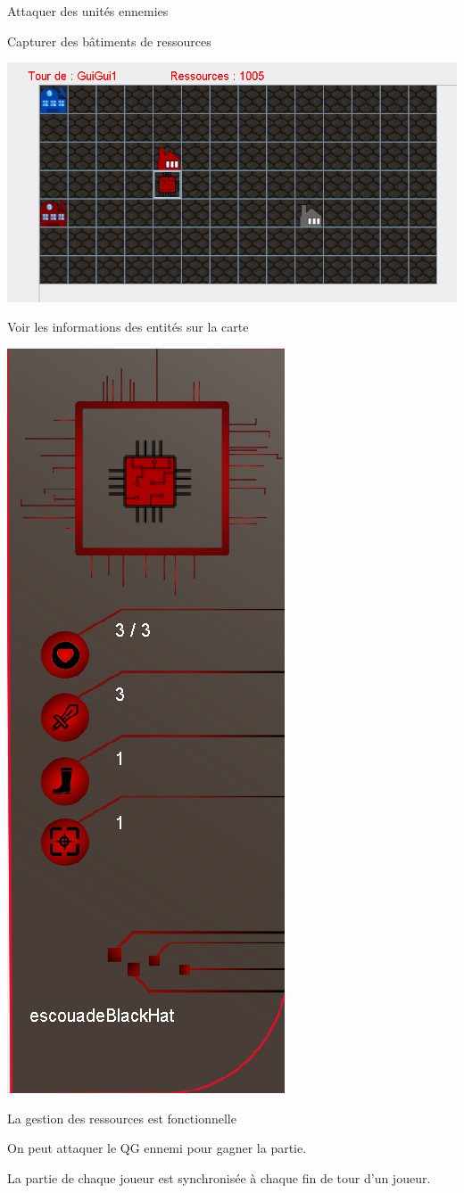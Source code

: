 \documentclass[a4paper,11pt]{report}
\begin{document}
	Attaquer des unités ennemies
	
	Capturer des bâtiments de ressources
	
	\begin{center}
	\includegraphics[scale=0.5]{Assets/CaptureSucces.png} 
	\end{center}
	
	Voir les informations des entités sur la carte
	
	\begin{center}
	\includegraphics[scale=0.3]{Assets/InfosCarte.png} 
	\end{center}
	
    La gestion des ressources est fonctionnelle
	
	 On peut attaquer le QG ennemi pour gagner la partie.
	
 La partie de chaque joueur est synchronisée à chaque fin de tour d'un joueur.
	
	


	
\end{document}
